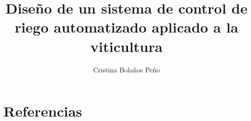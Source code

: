 \documentclass{pre-tfg}
\title{Diseño de un sistema de control de riego automatizado aplicado a la viticultura}
\author{Cristina Bolaños Peño}
\begin{document}
\maketitle

    \tableofcontents
    
    
    
    
    
    
    
    
    
    
    
%    
    \newpage \section{Referencias}
    \begingroup
        \renewcommand{\section}[2]{}
        \printbibliography
    \endgroup
\end{document}
